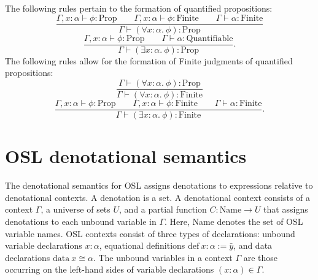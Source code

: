 \documentclass[11pt]{article}
\begin{document}
The following rules pertain to the formation of quantified
propositions:
\begin{equation}
	\frac{\Gamma, x : \alpha \vdash \phi : \text{Prop}
	\qquad \Gamma, x : \alpha \vdash \phi : \text{Finite}
	\qquad \Gamma \vdash \alpha : \text{Finite}}
	{\Gamma \vdash (\forall x : \alpha.\ \phi) : \text{Prop}}
\end{equation}
\begin{equation}
	\frac{\Gamma, x : \alpha \vdash \phi : \text{Prop}
	\qquad \Gamma \vdash \alpha : \text{Quantifiable}}
	{\Gamma \vdash (\exists x : \alpha.\ \phi) : \text{Prop}}.
\end{equation}
The following rules allow for the formation of Finite judgments
of quantified propositions:
\begin{equation}
	\frac{\Gamma \vdash (\forall x : \alpha.\ \phi) : \text{Prop}}
	{\Gamma \vdash (\forall x : \alpha.\ \phi) : \text{Finite}}
\end{equation}
\begin{equation}
	\frac{\Gamma, x : \alpha \vdash \phi : \text{Prop}
	\qquad \Gamma, x : \alpha \vdash \phi : \text{Finite}
	\qquad \Gamma \vdash \alpha : \text{Finite}}
	{\Gamma \vdash (\exists x : \alpha.\ \phi) : \text{Finite}}.
\end{equation}


\section{OSL denotational semantics}
\label{sec:osl-semantics}

The denotational semantics for OSL assigns denotations to expressions
relative to denotational contexts. A denotation is a set.
A denotational context consists of a context $\Gamma$, a universe of
sets $U$, and a partial function $C : \text{Name} \to U$ that
assigns denotations to each unbound variable in $\Gamma$.
Here, Name denotes the set of OSL variable names.
OSL contexts consist of three types of declarations:
unbound variable declarations $x : \alpha$, equational definitions
$\text{def}\ x : \alpha := \bar{y}$, and data declarations
$\text{data}\ x \cong \alpha$. The unbound variables in a context
$\Gamma$ are those occurring on the left-hand sides of variable
declarations $(x : \alpha) \in \Gamma$.
\end{document}
